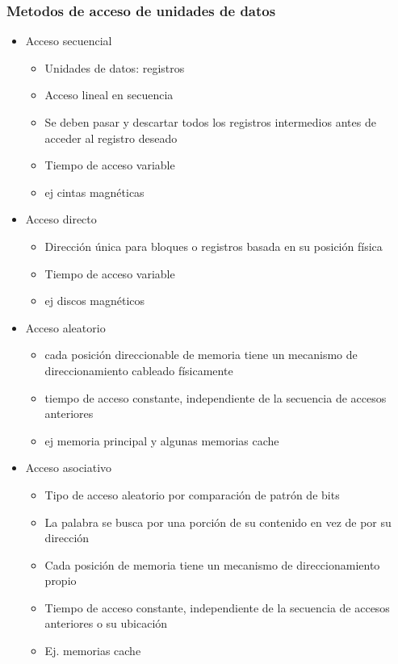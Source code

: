 \subsubsection{Metodos de acceso de unidades de datos}
	\begin{itemize}
	\item Acceso secuencial
		\begin{itemize}
		\item Unidades de datos: registros 
		\item Acceso lineal en secuencia
		\item Se deben pasar y descartar todos los registros intermedios antes de acceder al registro deseado
		\item Tiempo de acceso variable
		\item ej cintas magnéticas
		\end{itemize}
	\item Acceso directo
		\begin{itemize}
		\item Dirección única para bloques o registros basada en su posición física
		\item Tiempo de acceso variable
		\item ej discos magnéticos
		\end{itemize}
	\item Acceso aleatorio
		\begin{itemize}
		\item cada posición direccionable de memoria tiene un mecanismo de direccionamiento cableado físicamente
		\item tiempo de acceso constante, independiente de la secuencia de accesos anteriores
		\item ej memoria principal y algunas memorias cache
		\end{itemize}
	\item Acceso asociativo
		\begin{itemize}
		\item Tipo de acceso aleatorio por comparación de patrón de bits
		\item La palabra se busca por una porción de su contenido en vez de por su dirección
		\item Cada posición de memoria tiene un mecanismo de direccionamiento propio
		\item Tiempo de acceso constante, independiente de la secuencia de accesos anteriores o su ubicación
		\item Ej. memorias cache
		\end{itemize}
	\end{itemize}
	
